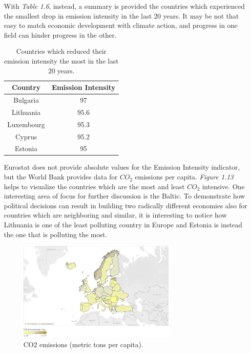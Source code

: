 \documentclass{book}
\begin{document}
With \textit{Table 1.6}, instead, a summary is provided the countries which experienced the smallest drop in emission intensity in the last 20 years. It may be not that easy to match economic development with climate action, and progress in one field can hinder progress in the other.

\bigskip
\begin{table}[H]
\begin{center}
\begin{tabular}{|c|c|}
\hline
\rowcolor{lightgray}Country & Emission Intensity \\
\hline
Bulgaria & 97\\
Lithuania & 95.6\\
Luxembourg & 95.3\\
Cyprus & 95.2\\
Estonia & 95\\
\hline
\end{tabular}
\caption{Countries which reduced their emission intensity the most in the last 20 years.}
\end{center}
\end{table}
\bigskip

Eurostat does not provide absolute values for the Emission Intensity indicator, but the World Bank provides data for $CO_{2}$ emissions per capita. \textit{Figure 1.13} helps to visualize the countries which are the most and least $CO_{2}$ intensive. One interesting area of focus for further discussion is the Baltic. To demonstrate how political decisions can result in building two radically different economies also for countries which are neighboring and similar, it is interesting to notice how Lithuania is one of the least polluting country in Europe and Estonia is instead the one that is polluting the most.

\bigskip
\begin{figure}[H]
\begin{center}
\captionsetup{justification=centering}
\includegraphics[width=0.7\textwidth]{Images/intensiti.png}
\caption{CO2 emissions (metric tons per capita). }
\end{center}
\end{figure}
\bigskip
\end{document}
